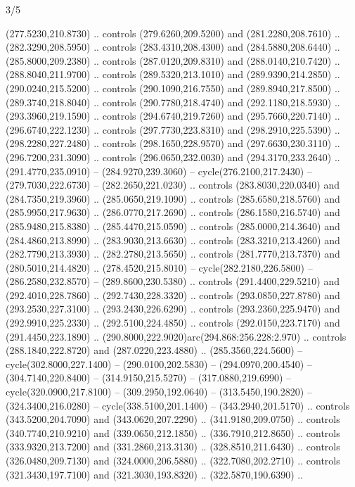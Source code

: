 \begin{flagdescription}{3/5}
\begin{scope} [xshift=0.5\flagwidth*\stretchfactor,yshift=0.5\flagwidth,scale=\flagwidth/391]
\begin{scope}[y=0.8pt, x=0.8pt, yscale=-1, xscale=1,line width=0.01\lw,shift={(-98.875,-338.125)}]
\begin{scope}[cm={{0.15382,0.0,0.0,0.15382,(34.72393,273.11413)}}]
  (277.5230,210.8730) .. controls (279.6260,209.5200) and (281.2280,208.7610) ..
  (282.3290,208.5950) .. controls (283.4310,208.4300) and (284.5880,208.6440) ..
  (285.8000,209.2380) .. controls (287.0120,209.8310) and (288.0140,210.7420) ..
  (288.8040,211.9700) .. controls (289.5320,213.1010) and (289.9390,214.2850) ..
  (290.0240,215.5200) .. controls (290.1090,216.7550) and (289.8940,217.8500) ..
  (289.3740,218.8040) .. controls (290.7780,218.4740) and (292.1180,218.5930) ..
  (293.3960,219.1590) .. controls (294.6740,219.7260) and (295.7660,220.7140) ..
  (296.6740,222.1230) .. controls (297.7730,223.8310) and (298.2910,225.5390) ..
  (298.2280,227.2480) .. controls (298.1650,228.9570) and (297.6630,230.3110) ..
  (296.7200,231.3090) .. controls (296.0650,232.0030) and (294.3170,233.2640) ..
  (291.4770,235.0910) -- (284.9270,239.3060) -- cycle(276.2100,217.2430) --
  (279.7030,222.6730) -- (282.2650,221.0230) .. controls (283.8030,220.0340) and
  (284.7350,219.3960) .. (285.0650,219.1090) .. controls (285.6580,218.5760) and
  (285.9950,217.9630) .. (286.0770,217.2690) .. controls (286.1580,216.5740) and
  (285.9480,215.8380) .. (285.4470,215.0590) .. controls (285.0000,214.3640) and
  (284.4860,213.8990) .. (283.9030,213.6630) .. controls (283.3210,213.4260) and
  (282.7790,213.3930) .. (282.2780,213.5650) .. controls (281.7770,213.7370) and
  (280.5010,214.4820) .. (278.4520,215.8010) -- cycle(282.2180,226.5800) --
  (286.2580,232.8570) -- (289.8600,230.5380) .. controls (291.4400,229.5210) and
  (292.4010,228.7860) .. (292.7430,228.3320) .. controls (293.0850,227.8780) and
  (293.2530,227.3100) .. (293.2430,226.6290) .. controls (293.2360,225.9470) and
  (292.9910,225.2330) .. (292.5100,224.4850) .. controls (292.0150,223.7170) and
  (291.4450,223.1890) .. (290.8000,222.9020)arc(294.868:256.228:2.970) ..
  controls (288.1840,222.8720) and (287.0220,223.4880) .. (285.3560,224.5600) --
  cycle(302.8000,227.1400) -- (290.0100,202.5830) -- (294.0970,200.4540) --
  (304.7140,220.8400) -- (314.9150,215.5270) -- (317.0880,219.6990) --
  cycle(320.0900,217.8100) -- (309.2950,192.0640) -- (313.5450,190.2820) --
  (324.3400,216.0280) -- cycle(338.5100,201.1400) -- (343.2940,201.5170) ..
  controls (343.5200,204.7090) and (343.0620,207.2290) .. (341.9180,209.0750) ..
  controls (340.7740,210.9210) and (339.0650,212.1850) .. (336.7910,212.8650) ..
  controls (333.9320,213.7200) and (331.2860,213.3130) .. (328.8510,211.6430) ..
  controls (326.0480,209.7130) and (324.0000,206.5880) .. (322.7080,202.2710) ..
  controls (321.3430,197.7100) and (321.3030,193.8320) .. (322.5870,190.6390) ..

\end{scope}
\end{scope}
\end{scope}
\end{flagdescription}
